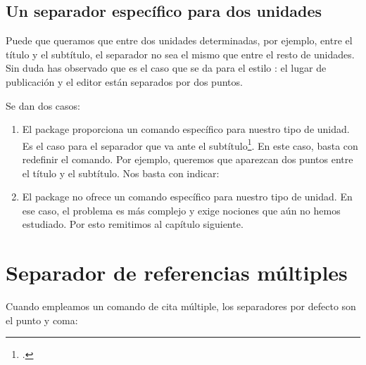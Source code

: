     
\subsection{Un separador específico para dos unidades}
    
   Puede que queramos que entre dos unidades determinadas, por ejemplo, entre el título y el subtítulo, el separador no sea el mismo que entre el resto de unidades. Sin duda has observado que es el caso que se da para el estilo : el lugar de publicación y el editor están separados por dos puntos.
    
    Se dan dos casos:
        \begin{enumerate}
            \item El package  proporciona un comando específico para nuestro tipo de unidad. Es el caso para el separador que va ante el subtítulo\footcite[Estos comandos no son muy numerosos: aparecen en][]{biblatex_hooks}. En este caso, basta con redefinir el comando. Por ejemplo, queremos que aparezcan dos puntos entre el título y el subtítulo. Nos basta con indicar:
            
            \begin{latexcode}
\renewcommand{\subtitlepunct}[0]{\addspace\addcolon\addspace}
            \end{latexcode}

            
            \item El package no ofrece un comando específico para nuestro tipo de unidad. En ese caso, el problema es más complejo y exige nociones que aún no hemos estudiado. Por esto remitimos al capítulo siguiente.
        \end{enumerate}
        
\section{Separador de referencias múltiples}\label{multicitedelim}

Cuando empleamos un comando de cita múltiple, los separadores por defecto son el punto y coma:


\begin{latexcode}
\autocites{Saxer1980}{Junod1992}
\end{latexcode}

\bibverbose
\begin{quotation}
\cites{Saxer1980}{Junod1992}
\end{quotation}
\bibverbosetrad

